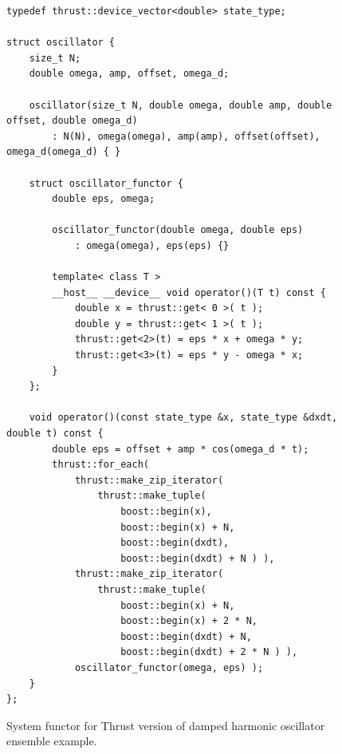 \documentclass[1p]{elsarticle}
\begin{document}
\begin{figure}[p]
\begin{lstlisting}
typedef thrust::device_vector<double> state_type;

struct oscillator {
    size_t N;
    double omega, amp, offset, omega_d;

    oscillator(size_t N, double omega, double amp, double offset, double omega_d)
        : N(N), omega(omega), amp(amp), offset(offset), omega_d(omega_d) { }

    struct oscillator_functor {
        double eps, omega;

        oscillator_functor(double omega, double eps)
            : omega(omega), eps(eps) {}

        template< class T >
        __host__ __device__ void operator()(T t) const {
            double x = thrust::get< 0 >( t );
            double y = thrust::get< 1 >( t );
            thrust::get<2>(t) = eps * x + omega * y;
            thrust::get<3>(t) = eps * y - omega * x;
        }
    };

    void operator()(const state_type &x, state_type &dxdt, double t) const {
        double eps = offset + amp * cos(omega_d * t);
        thrust::for_each(
            thrust::make_zip_iterator(
                thrust::make_tuple(
                    boost::begin(x),
                    boost::begin(x) + N,
                    boost::begin(dxdt),
                    boost::begin(dxdt) + N ) ),
            thrust::make_zip_iterator(
                thrust::make_tuple(
                    boost::begin(x) + N,
                    boost::begin(x) + 2 * N,
                    boost::begin(dxdt) + N,
                    boost::begin(dxdt) + 2 * N ) ),
            oscillator_functor(omega, eps) );
    }
};
\end{lstlisting}
\caption{System functor for Thrust version of damped harmonic oscillator
ensemble example.}
\label{code:thrust:damped}
\end{figure}
\end{document}
